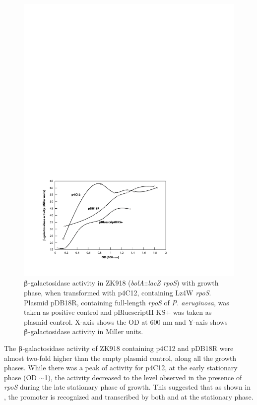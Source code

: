 \begin{figure}[tbp]
\begin{narrow}{-1in}{-1in}
\centering
\includegraphics{figures/chap5_zk918}
\end{narrow}
\caption[$\betaup$-galactosidase activity in transformed
ZK918]{$\betaup$-galactosidase activity in ZK918
(\emph{bolA}::\emph{lacZ} \emph{rpoS}) with growth phase, when
transformed with p4C12, containing Lz4W \emph{rpoS}. Plasmid
pDB18R, containing full-length \emph{rpoS} of \emph{P.
aeruginosa}, was taken as positive control and pBluescriptII KS+
was taken as plasmid control. X-axis shows the OD at 600 nm and
Y-axis shows $\betaup$-galactosidase activity in Miller units.}
\label{chap5:zk918}
\end{figure}

The $\betaup$-galactosidase activity of ZK918 containing p4C12 and
pDB18R were almost two-fold higher than the empty plasmid control,
along all the growth phases. While there was a peak of activity
for p4C12, at the early stationary phase (OD $\sim$1),
the activity decreased to the level observed in the presence of
 \emph{rpoS} during the late stationary phase of growth.
This suggested that as shown in , the  promoter
is recognized and transcribed by both \lzsig{} and \pasig{} at the
stationary phase.

